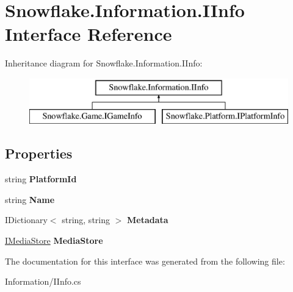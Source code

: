 \hypertarget{interface_snowflake_1_1_information_1_1_i_info}{}\section{Snowflake.\+Information.\+I\+Info Interface Reference}
\label{interface_snowflake_1_1_information_1_1_i_info}
Inheritance diagram for Snowflake.\+Information.\+I\+Info\+:\begin{figure}[H]
\begin{center}
\leavevmode
\includegraphics[height=2.000000cm]{interface_snowflake_1_1_information_1_1_i_info}
\end{center}
\end{figure}
\subsection*{Properties}
\begin{DoxyCompactItemize}
\item 
\hypertarget{interface_snowflake_1_1_information_1_1_i_info_adbca5b9f2db24b233866de3304500088}{}string {\bfseries Platform\+Id}\label{interface_snowflake_1_1_information_1_1_i_info_adbca5b9f2db24b233866de3304500088}

\item 
\hypertarget{interface_snowflake_1_1_information_1_1_i_info_ad9450963e1d3443d2e5df274638fd8be}{}string {\bfseries Name}\label{interface_snowflake_1_1_information_1_1_i_info_ad9450963e1d3443d2e5df274638fd8be}

\item 
\hypertarget{interface_snowflake_1_1_information_1_1_i_info_aeae6832deb9c513619b82c82ab94421c}{}I\+Dictionary$<$ string, string $>$ {\bfseries Metadata}\label{interface_snowflake_1_1_information_1_1_i_info_aeae6832deb9c513619b82c82ab94421c}

\item 
\hypertarget{interface_snowflake_1_1_information_1_1_i_info_a871b33234ef2b413be1ee8e6846768b6}{}\hyperlink{interface_snowflake_1_1_information_1_1_media_store_1_1_i_media_store}{I\+Media\+Store} {\bfseries Media\+Store}\label{interface_snowflake_1_1_information_1_1_i_info_a871b33234ef2b413be1ee8e6846768b6}

\end{DoxyCompactItemize}


The documentation for this interface was generated from the following file\+:\begin{DoxyCompactItemize}
\item 
Information/I\+Info.\+cs\end{DoxyCompactItemize}

